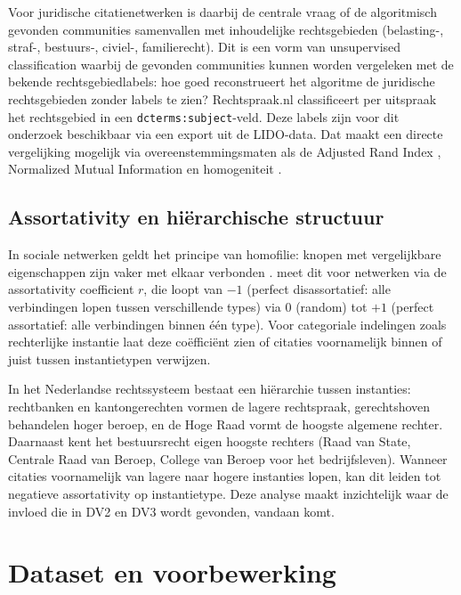 \documentclass[a4paper, 12pt]{report}
\begin{document}
Voor juridische citatienetwerken is daarbij de centrale vraag of de algoritmisch gevonden communities samenvallen met inhoudelijke rechtsgebieden (belasting-, straf-, bestuurs-, civiel-, familierecht). Dit is een vorm van unsupervised classification waarbij de gevonden communities kunnen worden vergeleken met de bekende rechtsgebiedlabels: hoe goed reconstrueert het algoritme de juridische rechtsgebieden zonder labels te zien? Rechtspraak.nl classificeert per uitspraak het rechtsgebied in een \texttt{dcterms:subject}-veld. Deze labels zijn voor dit onderzoek beschikbaar via een export uit de LIDO-data. Dat maakt een directe vergelijking mogelijk via overeenstemmingsmaten als de Adjusted Rand Index \parencite{hubert1985}, Normalized Mutual Information \parencite{Danon_2005} en homogeniteit \parencite{rosenberg2007}.


\section{Assortativity en hiërarchische structuur}

In sociale netwerken geldt het principe van homofilie: knopen met vergelijkbare eigenschappen zijn vaker met elkaar verbonden \parencite{mcpherson2001}. \textcite{newman2003} meet dit voor netwerken via de assortativity coefficient $r$, die loopt van $-1$ (perfect disassortatief: alle verbindingen lopen tussen verschillende types) via 0 (random) tot $+1$ (perfect assortatief: alle verbindingen binnen één type). Voor categoriale indelingen zoals rechterlijke instantie laat deze coëfficiënt zien of citaties voornamelijk binnen of juist tussen instantietypen verwijzen.

In het Nederlandse rechtssysteem bestaat een hiërarchie tussen instanties: rechtbanken en kantongerechten vormen de lagere rechtspraak, gerechtshoven behandelen hoger beroep, en de Hoge Raad vormt de hoogste algemene rechter. Daarnaast kent het bestuursrecht eigen hoogste rechters (Raad van State, Centrale Raad van Beroep, College van Beroep voor het bedrijfsleven). Wanneer citaties voornamelijk van lagere naar hogere instanties lopen, kan dit leiden tot negatieve assortativity op instantietype. Deze analyse maakt inzichtelijk waar de invloed die in DV2 en DV3 wordt gevonden, vandaan komt.

\chapter{Dataset en voorbewerking}
\label{ch:dataset}
\end{document}

